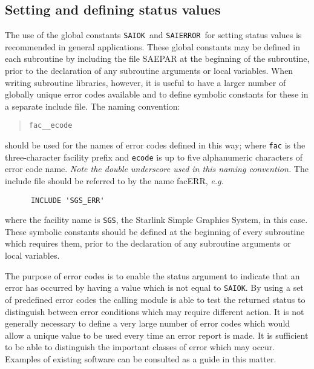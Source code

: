 \documentclass[twoside,11pt]{article}
\newcommand{\xlabel}[1]{}
\renewcommand{\_}{\texttt{\symbol{95}}}
\newcommand{\const}[1]{\texttt{#1}}
\newcommand{\saiok}{\const{SAI\_\_OK}}
\newcommand{\saierr}{\const{SAI\_\_ERROR}}
\begin{document}
\subsection{\xlabel{setting_and_defining_status_values}Setting and defining status values \label{def_sect}}

The use of the global constants \saiok\ and \saierr\ for setting
status values is recommended in general applications.
These global constants may be defined in each subroutine by including the
file SAE\_PAR at the beginning of the subroutine, prior to the declaration
of any subroutine arguments or local variables.
When writing subroutine libraries, however, it is useful to have a larger
number of globally unique error codes available and to define symbolic
constants for these in a separate include
file.
The naming convention:

\begin {quote}
\begin {small}
\begin{verbatim}
fac__ecode
\end{verbatim}
\end {small}
\end {quote}

should be used for the names of error codes defined in this way; where
\texttt{fac} is the three-character facility prefix and \texttt{ecode} is up
to five alphanumeric characters of error code name.
\emph{Note the double underscore used in this naming convention.}
The include file should be referred to by the name fac\_ERR, \textit{e.g.}

\begin {small}
\begin{verbatim}
      INCLUDE 'SGS_ERR'
\end{verbatim}
\end {small}

where the facility name is \texttt{SGS}, the Starlink Simple Graphics System,
in this case.
These symbolic constants should be defined at the beginning of every
subroutine which requires them, prior to the declaration of any subroutine
arguments or local variables.

The purpose of error codes is to enable the status argument to indicate that an
error has occurred by having a value which is not equal to \saiok.
By using a set of predefined error codes the calling module is
able to test the returned status to distinguish between error conditions
which may require different action.
It is not generally necessary to define a very large number of error codes
which would allow a unique value to be used every time an error report is
made.
It is sufficient to be able to distinguish the important classes of error which
may occur.
Examples of existing software can be consulted as a guide in this matter.
\end{document}
